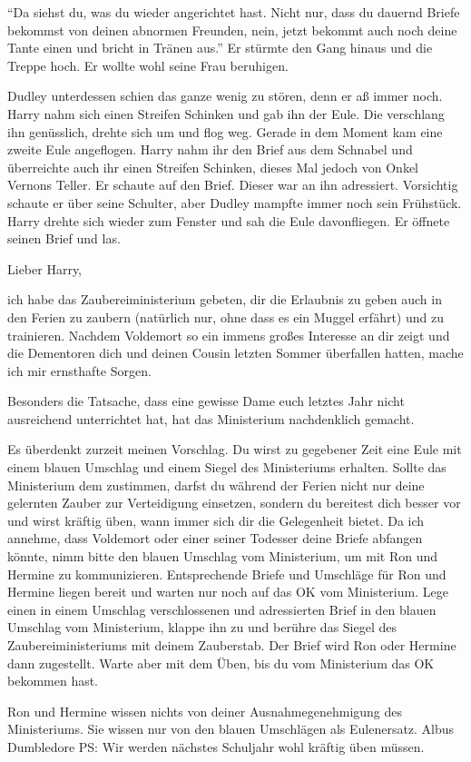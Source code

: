 \enquote{Da siehst du, was du wieder angerichtet hast. Nicht nur, dass du dauernd Briefe bekommst von deinen abnormen Freunden, nein, jetzt bekommt auch noch deine Tante einen und bricht in Tränen aus.} Er stürmte den Gang hinaus und die Treppe hoch. Er wollte wohl seine Frau beruhigen.

Dudley unterdessen schien das ganze wenig zu stören, denn er aß immer noch. Harry nahm sich einen Streifen Schinken und gab ihn der Eule. Die verschlang ihn genüsslich, drehte sich um und flog weg. Gerade in dem Moment kam eine zweite Eule angeflogen. Harry nahm ihr den Brief aus dem Schnabel und überreichte auch ihr einen Streifen Schinken, dieses Mal jedoch von Onkel Vernons Teller. Er schaute auf den Brief. Dieser war an ihn adressiert. Vorsichtig schaute er über seine Schulter, aber Dudley mampfte immer noch sein Frühstück. Harry drehte sich wieder zum Fenster und sah die Eule davonfliegen. Er öffnete seinen Brief und las.

\begin{brief}
Lieber Harry,

ich habe das Zaubereiministerium gebeten, dir die Erlaubnis zu geben auch in den Ferien zu zaubern (natürlich nur, ohne dass es ein Muggel erfährt) und zu trainieren. Nachdem Voldemort so ein immens großes Interesse an dir zeigt und die Dementoren dich und deinen Cousin letzten Sommer überfallen hatten, mache ich mir ernsthafte Sorgen.

Besonders die Tatsache, dass eine gewisse Dame euch letztes Jahr nicht ausreichend unterrichtet hat, hat das Ministerium nachdenklich gemacht.

Es überdenkt zurzeit meinen Vorschlag. Du wirst zu gegebener Zeit eine Eule mit einem blauen Umschlag und einem Siegel des Ministeriums erhalten. Sollte das Ministerium dem zustimmen, darfst du während der Ferien nicht nur deine gelernten Zauber zur Verteidigung einsetzen, sondern du bereitest dich besser vor und wirst kräftig üben, wann immer sich dir die Gelegenheit bietet. Da ich annehme, dass Voldemort oder einer seiner Todesser deine Briefe abfangen könnte, nimm bitte den blauen Umschlag vom Ministerium, um mit Ron und Hermine zu kommunizieren. Entsprechende Briefe und Umschläge für Ron und Hermine liegen bereit und warten nur noch auf das OK vom Ministerium. Lege einen in einem Umschlag verschlossenen und adressierten Brief in den blauen Umschlag vom Ministerium, klappe ihn zu und berühre das Siegel des Zaubereiministeriums mit deinem Zauberstab. Der Brief wird Ron oder Hermine dann zugestellt. Warte aber mit dem Üben, bis du vom Ministerium das OK bekommen hast.

Ron und Hermine wissen nichts von deiner Ausnahmegenehmigung des Ministeriums. Sie wissen nur von den blauen Umschlägen als Eulenersatz.
\signumspace
Albus Dumbledore
\signumspace
PS: Wir werden nächstes Schuljahr wohl kräftig üben müssen.
\end{brief}

